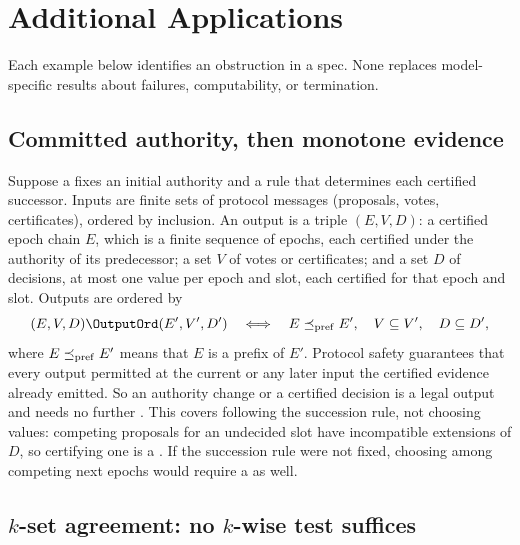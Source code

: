 \section{Additional Applications}
\label{app:additional-applications}

Each example below identifies an obstruction in a spec.  None
replaces model-specific results about failures, computability, or
termination.

\subsection{Committed authority, then monotone evidence}

Suppose a \commitment fixes an initial authority and a rule that determines
each certified successor.  Inputs are finite sets of protocol messages (proposals,
votes, certificates), ordered by inclusion.  An output is a triple $(E,V,D)$:
a certified epoch chain $E$, which is a finite sequence of epochs, each
certified under the authority of its predecessor; a set $V$ of votes or certificates; and a set
$D$ of decisions, at most one value per epoch and slot, each certified for
that epoch and slot.  Outputs are
ordered by
\begin{equation}
  (E,V,D)\OutputOrd(E',V',D')
  \quad\Longleftrightarrow\quad
  E\preceq_{\rm pref}E',\quad V\subseteq V',\quad D\subseteq D',
  \label{eq:authority-refinement}
\end{equation}
where $E\preceq_{\rm pref}E'$ means that $E$ is a prefix of $E'$.
Protocol safety guarantees that every output permitted at the current or any
later input \outrel the certified evidence already emitted.  So an authority
change or a certified decision is a legal output and needs no further
\commitment.  This covers following the succession rule, not choosing
values: competing proposals for an undecided slot have incompatible extensions
of $D$, so certifying one is a \commitment.  If the succession rule were not
fixed, choosing among competing next epochs would require a \commitment as
well.

\subsection{$k$-set agreement: no $k$-wise test suffices}

